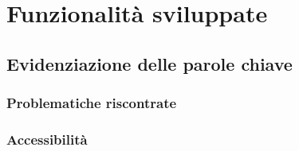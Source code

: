 \chapter{Funzionalità sviluppate}
\label{cap:funzionalità-sviluppate}

\section{Evidenziazione delle parole chiave}

\subsection{Problematiche riscontrate}

\subsection{Accessibilità}
